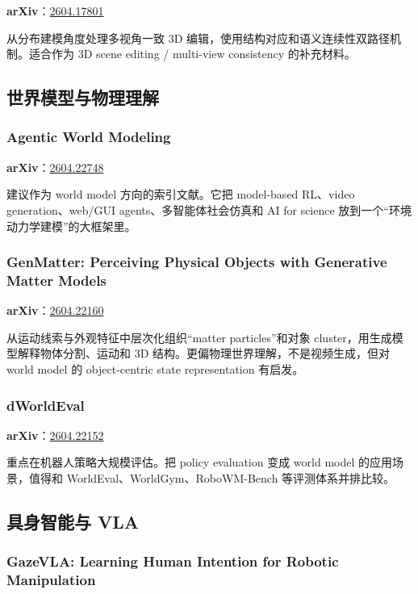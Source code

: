 \textbf{arXiv}：\href{https://arxiv.org/abs/2604.17801}{2604.17801}

从分布建模角度处理多视角一致 3D 编辑，使用结构对应和语义连续性双路径机制。适合作为 3D scene editing / multi-view consistency 的补充材料。

\subsection{世界模型与物理理解}

\subsubsection{Agentic World Modeling}

\textbf{arXiv}：\href{https://arxiv.org/abs/2604.22748}{2604.22748}

建议作为 world model 方向的索引文献。它把 model-based RL、video generation、web/GUI agents、多智能体社会仿真和 AI for science 放到一个“环境动力学建模”的大框架里。

\subsubsection{GenMatter: Perceiving Physical Objects with Generative Matter Models}

\textbf{arXiv}：\href{https://arxiv.org/abs/2604.22160}{2604.22160}

从运动线索与外观特征中层次化组织“matter particles”和对象 cluster，用生成模型解释物体分割、运动和 3D 结构。更偏物理世界理解，不是视频生成，但对 world model 的 object-centric state representation 有启发。

\subsubsection{dWorldEval}

\textbf{arXiv}：\href{https://arxiv.org/abs/2604.22152}{2604.22152}

重点在机器人策略大规模评估。把 policy evaluation 变成 world model 的应用场景，值得和 WorldEval、WorldGym、RoboWM-Bench 等评测体系并排比较。

\subsection{具身智能与 VLA}

\subsubsection{GazeVLA: Learning Human Intention for Robotic Manipulation}

